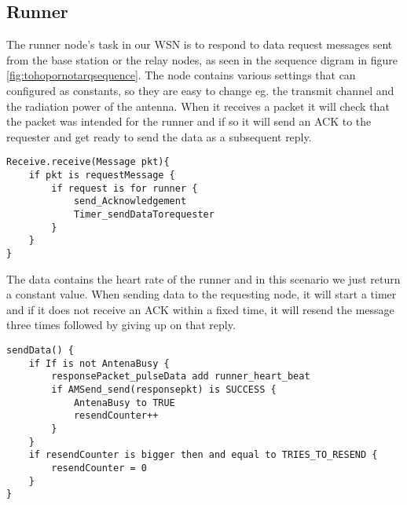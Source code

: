 \subsection{Runner}\label{sc:runner}

The runner node's task in our WSN is to respond to data request messages sent from the base station or the relay nodes, as seen in the sequence digram in figure \ref{fig:tohopornotarqsequence}. The node contains various settings that can configured as constants, so they are easy to change eg. the transmit channel and the radiation power of the antenna. When it receives a packet it will check that the packet was intended for the runner and if so it will send an ACK to the requester and get ready to send the data as a subsequent reply.

\begin{minipage}[t]{0.95\linewidth}
\begin{lstlisting}[label={lst:runner1}, caption={Runner receives requests and responds.}]
Receive.receive(Message pkt){
	if pkt is requestMessage {
		if request is for runner {
			send_Acknowledgement
			Timer_sendDataTorequester
		}
	} 
}
\end{lstlisting}
\end{minipage}

\noindent The data contains the heart rate of the runner and in this scenario we just return a constant value. When sending data to the requesting node, it will start a timer and if it does not receive an ACK within a fixed time, it will resend the message three times followed by giving up on that reply.

\begin{minipage}[t]{0.95\linewidth}
\begin{lstlisting}[label={lst:runner2}, caption={Runner sends data packet with runner's heart rate.}]
sendData() {
	if If is not AntenaBusy {
		responsePacket_pulseData add runner_heart_beat
		if AMSend_send(responsepkt) is SUCCESS {
			AntenaBusy to TRUE
			resendCounter++
		}
	}
	if resendCounter is bigger then and equal to TRIES_TO_RESEND {
		resendCounter = 0
	}
}
\end{lstlisting}
\end{minipage}